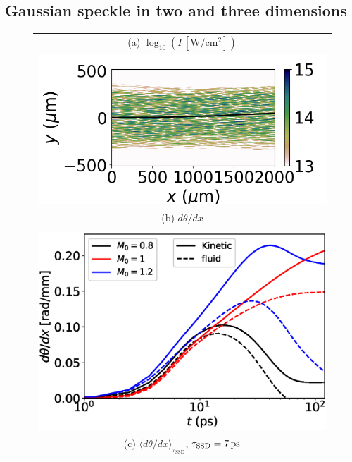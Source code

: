 \documentclass[%
 reprint,
 amsmath,amssymb,
 aps,
]{revtex4-1}
\begin{document}
\subsection{ Gaussian speckle in two and three dimensions }\label{sec:gauss3D}

\begin{figure}
\begin{tabular}{c}
(a) $\log_{10}(I \, [\mathrm{W/cm^2}])$\\
\includegraphics[scale=0.46]{I_Hem1_100ps.png}\\
(b) $d\theta / dx$\\
\\\includegraphics[scale=0.45]{Fig1b.eps} \\
(c) $\langle d\theta/dx\rangle_{\tau_\mathrm{SSD} }$, $\tau_\mathrm{SSD}=7\, \rm ps$  \\

\end{tabular}
\end{figure}
\end{document}
